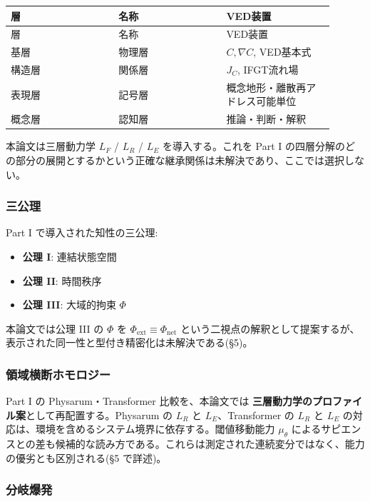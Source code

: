 \begin{longtable}{@{}p{0.30\linewidth}p{0.30\linewidth}p{0.30\linewidth}@{}}
\toprule
層 & 名称 & VED装置 \\
\midrule
\endfirsthead
\toprule
層 & 名称 & VED装置 \\
\midrule
\endhead
基層 & 物理層 & $C, \nabla C$, VED基本式 \\
構造層 & 関係層 & $J_C$, IFGT流れ場 \\
表現層 & 記号層 & 概念地形・離散再アドレス可能単位 \\
概念層 & 認知層 & 推論・判断・解釈 \\
\bottomrule
\end{longtable}


本論文は三層動力学 $L_F$ / $L_R$ / $L_E$ を導入する。これを Part I の四層分解のどの部分の展開とするかという正確な継承関係は未解決であり、ここでは選択しない。

\subsubsection{三公理}


Part I で導入された知性の三公理:

\begin{itemize}
\item \textbf{公理 I}: 連結状態空間
\item \textbf{公理 II}: 時間秩序
\item \textbf{公理 III}: 大域的拘束 $\Phi$
\end{itemize}


本論文では公理 III の $\Phi$ を $\Phi_{\text{ext}} \equiv \Phi_{\text{net}}$ という二視点の解釈として提案するが、表示された同一性と型付き精密化は未解決である(\S{}5)。

\subsubsection{領域横断ホモロジー}


Part I の Physarum・Transformer 比較を、本論文では \textbf{三層動力学のプロファイル案}として再配置する。Physarum の $L_R$ と $L_E$、Transformer の $L_R$ と $L_E$ の対応は、環境を含めるシステム境界に依存する。閾値移動能力 $\mu_\theta$ によるサピエンスとの差も候補的な読み方である。これらは測定された連続変分ではなく、能力の優劣とも区別される(\S{}5 で詳述)。

\subsubsection{分岐爆発}



